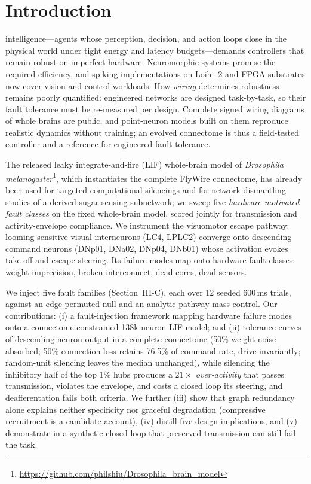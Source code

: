 \section{Introduction}
\label{sec:introduction}
 intelligence---agents whose perception, decision, and action loops close in the physical world under tight energy and latency budgets---demands controllers that remain robust on imperfect hardware\cite{yuan2026embodiedr,guo2026neurovla}. Neuromorphic systems promise the required efficiency\cite{gerven2025neuromorphic}, and spiking implementations on Loihi~2 and FPGA substrates now cover vision and control workloads\cite{wang2025neuromorphic,arfa2025hardwareaware,gautam2025neurocorex}. How \emph{wiring} determines robustness remains poorly quantified: engineered networks are designed task-by-task, so their fault tolerance must be re-measured per design\cite{thieu2022effects,yunusoglu2025neuromorphic}. Complete signed wiring diagrams of whole brains are public, and point-neuron models built on them reproduce realistic dynamics without training\cite{shiu2024drosophila,lin2024network}; an evolved connectome is thus a field-tested controller and a reference for engineered fault tolerance.

The released leaky integrate-and-fire (LIF) whole-brain model of \emph{Drosophila melanogaster}\cite{shiu2024drosophila}\footnote{\url{https://github.com/philshiu/Drosophila_brain_model}}, which instantiates the complete FlyWire connectome\cite{lin2024network}, has already been used for targeted computational silencings\cite{shiu2024drosophila} and for network-dismantling studies of a derived sugar-sensing subnetwork\cite{adler2026latent}; we sweep five \emph{hardware-motivated fault classes} on the fixed whole-brain model, scored jointly for transmission and activity-envelope compliance. We instrument the visuomotor escape pathway: looming-sensitive visual interneurons (LC4, LPLC2) converge onto descending command neurons (DNp01, DNa02, DNp04, DNb01) whose activation evokes take-off and escape steering\cite{simpson2023descending}. Its failure modes map onto hardware fault classes: weight imprecision, broken interconnect, dead cores, dead sensors.

We inject five fault families (Section~III-C), each over 12 seeded 600\,ms trials, against an edge-permuted null and an analytic pathway-mass control. Our contributions: (i) a fault-injection framework mapping hardware failure modes onto a connectome-constrained 138k-neuron LIF model; and (ii) tolerance curves of descending-neuron output in a complete connectome (50\% weight noise absorbed; 50\% connection loss retains 76.5\% of command rate, drive-invariantly; random-unit silencing leaves the median unchanged), while silencing the inhibitory half of the top 1\% hubs produces a $21\times$ \emph{over-activity} that passes transmission, violates the envelope, and costs a closed loop its steering, and deafferentation fails both criteria. We further (iii) show that graph redundancy alone explains neither specificity nor graceful degradation (compressive recruitment is a candidate account), (iv) distill five design implications, and (v) demonstrate in a synthetic closed loop that preserved transmission can still fail the task.